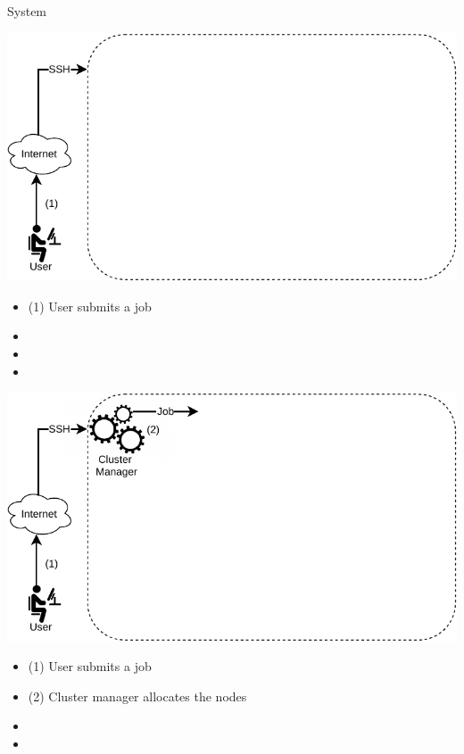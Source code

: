 \documentclass{beamer}
\begin{document}
\begin{frame}{System} 
\begin{center}
    \includegraphics[scale=0.65]{SLIDES/img/System1.pdf}
\end{center}
    \begin{itemize}
    \item (1) User submits a job
    \item[~] 
    \item[~]
    \item[~] 
    \end{itemize}
    \framebreak
\begin{center}
    \includegraphics[scale=0.65]{SLIDES/img/System2.pdf}
\end{center}
    \begin{itemize}
    \item (1) User submits a job
    \item (2) Cluster manager allocates the nodes
    \item[~] 
    \item[~]
    \end{itemize}
    \framebreak

\end{frame}
\end{document}
